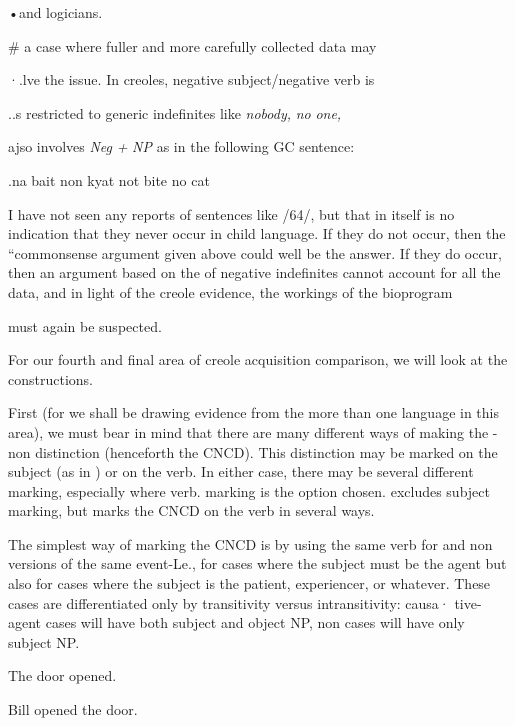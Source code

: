 •and logicians.

\# a case where fuller and more carefully collected data may

·.lve the issue. In creoles, negative subject/negative verb is

..s restricted to generic indefinites like \textit{nobody,} \textit{no} \textit{one,}

ajso involves \textit{Neg }\textit{+} \textit{NP }as in the following GC sentence:

.na bait non kyat not bite no cat


I have not seen any reports of sentences like /64/, but that in itself is no indication that they never occur in child language. If they do not occur, then the ``commonsense argument given above could well be the answer. If they do occur, then an argument based on the  of negative indefinites cannot account for all the data, and in light of the creole evidence, the workings of the bioprogram

must again be suspected.

For our fourth and final area of creole acquisition comparison, we will look at the   constructions.

First (for we shall be drawing evidence from the 
more than one language in this area), we must bear in mind that there are many different ways of making the -non dis\-tinction (henceforth the CNCD). This distinction may be marked on the subject (as in ) or on the verb. In either case, there may be several different  marking, especially where verb. marking is the option chosen.  excludes subject marking, but marks the CNCD on the verb in several ways.

The simplest way of marking the CNCD is by using the same
verb for  and non versions of the same event-Le., for cases where the subject must be the  agent but also for cases where the subject is the patient, experiencer, or whatever. These cases are differentiated only by transitivity versus intransitivity: causa· tive-agent cases will have both subject and object NP, non
cases will have only subject NP.

\ea\label{ex:65}
 The door opened.
\glt
\z

\ea\label{ex:66}
 Bill opened the door.
\glt
\z

